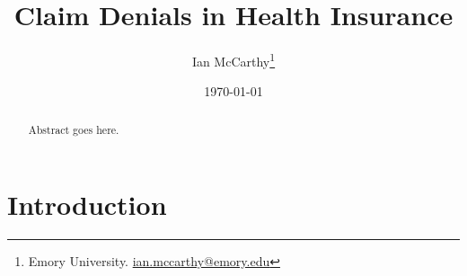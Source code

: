 \documentclass[12pt]{article}
\title{Claim Denials in Health Insurance}
\author{Ian McCarthy\thanks{Emory University.
\href{mailto:ian.mccarthy@emory.edu}{ian.mccarthy@emory.edu}}}
\date{\today}
\begin{document}
\maketitle

\begin{abstract}
\noindent Abstract goes here.
\end{abstract}

\clearpage

\section{Introduction}

\clearpage

\begin{singlespace}


\end{singlespace}
\end{document}
